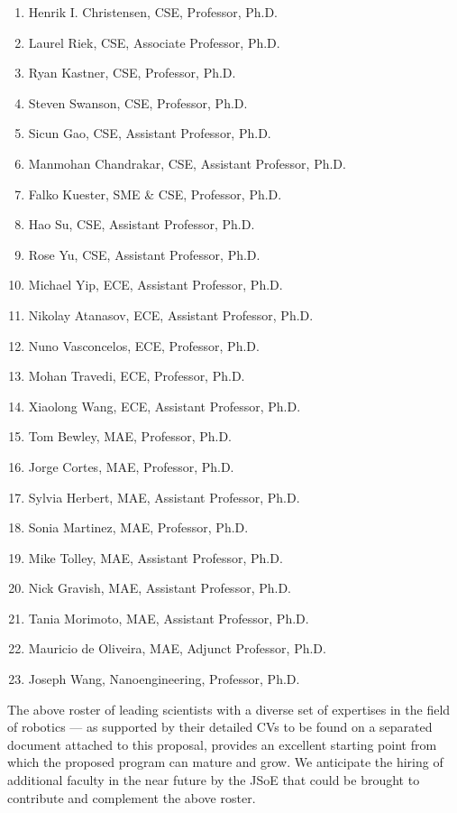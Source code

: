 \documentclass[11pt,letterpaper]{article}
\begin{document}
\begin{enumerate}
\item Henrik I. Christensen, CSE, Professor, Ph.D.
\item Laurel Riek, CSE, Associate Professor, Ph.D.
\item Ryan Kastner, CSE, Professor, Ph.D.
\item Steven Swanson, CSE, Professor, Ph.D.
\item Sicun Gao, CSE, Assistant Professor, Ph.D.
\item Manmohan Chandrakar, CSE, Assistant Professor, Ph.D.
\item Falko Kuester, SME \& CSE, Professor, Ph.D.
\item Hao Su, CSE, Assistant Professor, Ph.D.
\item Rose Yu, CSE, Assistant Professor, Ph.D.
\item Michael Yip, ECE, Assistant Professor, Ph.D.
\item Nikolay Atanasov, ECE, Assistant Professor, Ph.D.
\item Nuno Vasconcelos, ECE, Professor, Ph.D.
\item Mohan Travedi, ECE, Professor, Ph.D.
\item Xiaolong Wang, ECE, Assistant Professor, Ph.D.
\item Tom Bewley, MAE, Professor, Ph.D. 
\item Jorge Cortes, MAE, Professor, Ph.D. 
\item Sylvia Herbert, MAE, Assistant Professor, Ph.D.
\item Sonia Martinez, MAE, Professor, Ph.D. 
\item Mike Tolley, MAE, Assistant Professor, Ph.D. 
\item Nick Gravish, MAE, Assistant Professor, Ph.D.
\item Tania Morimoto, MAE, Assistant Professor, Ph.D.
\item Mauricio de Oliveira, MAE, Adjunct Professor, Ph.D.
\item Joseph Wang, Nanoengineering, Professor, Ph.D.
\end{enumerate}

The above roster of leading scientists with a diverse set of
expertises in the field of robotics --- as supported by their detailed
CVs to be found on a separated document attached to this proposal,
provides an excellent starting point from which the proposed program
can mature and grow. We anticipate the hiring of additional faculty in
the near future by the JSoE that could be brought to contribute and
complement the above roster.
\end{document}
